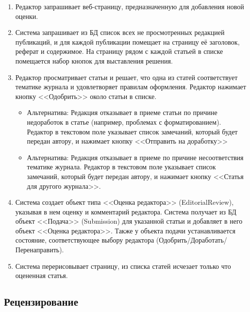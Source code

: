 \begin{enumerate}
\item Редактор запрашивает веб-страницу, предназначенную для добавления новой оценки.
\item Система запрашивает из БД список всех не просмотренных редакцией публикаций, и для каждой публикации помещает на страницу её заголовок, реферат и содержимое. На страницу рядом с каждой статьей в списке помещается набор кнопок для выставления решения.
\item Редактор просматривает статьи и решает, что одна из статей соответствует тематике журнала и удовлетворяет правилам оформления. Редактор нажимает кнопку <<Одобрить>> около статьи в списке.
  \begin{itemize}
  \item
    Альтернатива: Редакция отказывает в приеме статьи по причине недоработок в статье (например, проблемах с форматированием). Редактор в текстовом поле указывает список замечаний, который будет передан автору, и нажимает кнопку <<Отправить на доработку>>
  \item
    Альтернатива: Редакция отказывает в приеме по причине несоответствия тематике журнала. Редактор в текстовом поле указывает список замечаний, который будет передан автору, и нажимает кнопку <<Статья для другого журнала>>.
  \end{itemize}
\item Система создает объект типа <<Оценка редактора>> (EditorialReview), указывая в нем оценку и комментарий редактора. Система получает из БД объект <<Подача>> (Submission) для указанной статьи и добавляет в него объект <<Оценка редактора>>. Также у объекта подачи устанавливается состояние, соответствующее выбору редактора (Одобрить/Доработать/Перенаправить).
\item Система перерисовывает страницу, из списка статей исчезает только что оцененная статья.
\end{enumerate}

\subsection{Рецензирование}

